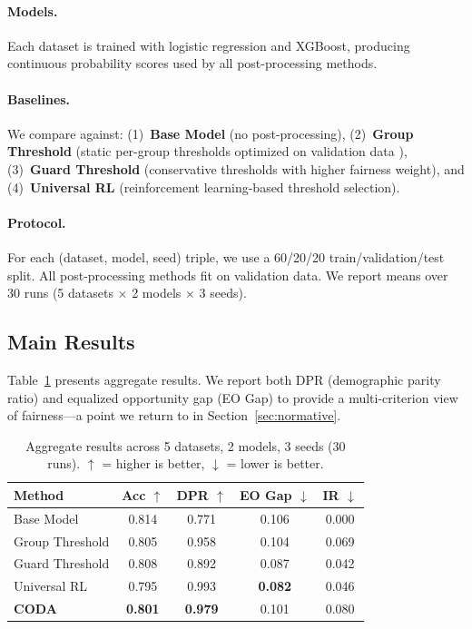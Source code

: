 \documentclass[letterpaper]{article} %
\theoremstyle{definition}
\begin{document}
\paragraph{Models.} Each dataset is trained with logistic regression and XGBoost, producing continuous probability scores used by all post-processing methods.

\paragraph{Baselines.} We compare against: (1)~\textbf{Base Model} (no post-processing), (2)~\textbf{Group Threshold} (static per-group thresholds optimized on validation data \cite{hardt2016equality}), (3)~\textbf{Guard Threshold} (conservative thresholds with higher fairness weight), and (4)~\textbf{Universal RL} (reinforcement learning-based threshold selection).

\paragraph{Protocol.} For each (dataset, model, seed) triple, we use a 60/20/20 train/validation/test split. All post-processing methods fit on validation data. We report means over 30 runs (5 datasets $\times$ 2 models $\times$ 3 seeds).

\subsection{Main Results}

Table~\ref{tab:main} presents aggregate results. We report both DPR (demographic parity ratio) and equalized opportunity gap (EO Gap) to provide a multi-criterion view of fairness---a point we return to in Section~\ref{sec:normative}.

\begin{table}[t]
\centering
\caption{Aggregate results across 5 datasets, 2 models, 3 seeds (30 runs). $\uparrow$ = higher is better, $\downarrow$ = lower is better.}
\label{tab:main}
\small
\begin{tabular}{@{}lcccc@{}}
\toprule
Method & Acc $\uparrow$ & DPR $\uparrow$ & EO Gap $\downarrow$ & IR $\downarrow$ \\
\midrule
Base Model & 0.814 & 0.771 & 0.106 & 0.000 \\
Group Threshold & 0.805 & 0.958 & 0.104 & 0.069 \\
Guard Threshold & 0.808 & 0.892 & 0.087 & 0.042 \\
Universal RL & 0.795 & 0.993 & \textbf{0.082} & 0.046 \\
\textbf{CODA} & \textbf{0.801} & \textbf{0.979} & 0.101 & 0.080 \\
\bottomrule
\end{tabular}
\end{table}
\end{document}
